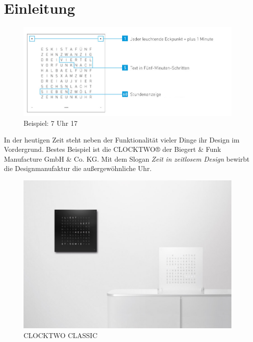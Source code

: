 
\section{Einleitung}
\label{sec:Einleitung}
\begin{figure}[h!]
    \centering
    \includegraphics[width=\textwidth]{Abbildungen/Uhrzeit_Beispiel}
    \caption[Uhrzeit_Bspl]{Beispiel: 7 Uhr 17}
    \label{fig:Uhrzeit_Bspl}
\end{figure}
%
In der heutigen Zeit steht neben der Funktionalität vieler Dinge ihr Design im Vordergrund. Bestes Beispiel ist die CLOCKTWO® der Biegert \&  Funk Manufacture GmbH \& Co. KG. Mit dem Slogan  \textit{Zeit in zeitlosem Design}  bewirbt die Designmanufaktur die außergewöhnliche Uhr.
%
\begin{figure}[h]
    \centering
    \includegraphics[width=\columnwidth]{Abbildungen/29}
    \caption[ClockTwo]{CLOCKTWO CLASSIC}
    \label{fig:Verbindungsdialog}
\end{figure}

